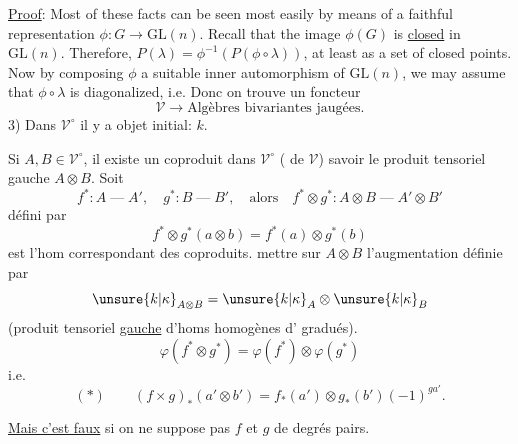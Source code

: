 \uline{Proof}: Most of these facts can be seen most easily by means of a faithful representation $\phi:G\longrightarrow\mathrm{GL}(n)$. Recall that the image $\phi(G)$ is \uline{closed} in $\mathrm{GL}(n)$. Therefore, $P(\lambda)=\phi^{-1}(P(\phi\circ\lambda))$, at least as a set of closed points. Now by composing $\phi$ \deleted{$\unsure{\Rightarrow}$} a suitable inner automorphism of $\mathrm{GL}(n)$, we may assume that $\phi\circ\lambda$ is diagonalized, i.e.
Donc on trouve un foncteur 
\[
\mathcal V\longrightarrow\text{Algèbres bivariantes jaugées}.
\]
3) Dans $\mathcal V^\circ$  il y a objet initial: $k$.

Si $A,B\in\mathcal V^\circ$, il existe un coproduit dans $\mathcal V^\circ$ ( de $\mathcal V$) savoir le produit tensoriel gauche $A\otimes B$. Soit
\[
f^*:A\mathbin{\text{---}}A',\quad g^*:B\mathbin{\text{---}}B',\quad\text{alors}\quad
f^*\otimes g^*:A\otimes B\mathbin{\text{---}}A'\otimes B'
\]
défini par
\[
f^*\otimes g^*(a\otimes b)=f^*(a)\otimes g^*(b)
\]
est l'hom correspondant des coproduits.   mettre sur $A\otimes B$ l'augmentation définie par
\[
\unsure{k|\kappa}_{A\otimes B}=\unsure{k|\kappa}_A\otimes\unsure{k|\kappa}_B
\]
(produit tensoriel \uline{gauche} d'homs homogènes d' gradués).
\quad{}
\[
\varphi(f^*\otimes g^*)=\varphi(f^*)\otimes\varphi(g^*)
\]
i.e.
\[
(*)\qquad(f\times g)_*(a'\otimes b')=f_*(a')\otimes g_*(b')(-1)^{ga'}.
\]

\uline{Mais c'est faux} si on ne suppose pas $f$ et $g$ de degrés pairs.

